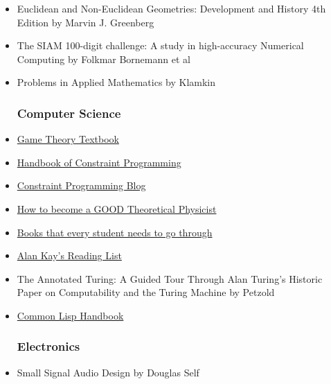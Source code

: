 \begin{itemize}
	\item Euclidean and Non-Euclidean Geometries: Development and History 4th Edition by Marvin J. Greenberg

	\item The SIAM 100-digit challenge: A study in high-accuracy Numerical Computing by Folkmar Bornemann et al

	\item Problems in Applied Mathematics by Klamkin

\subsubsection{Computer Science}

	\item  \href{http://arxiv.org/abs/1512.06808}{Game Theory Textbook}

	\item \href{http://cswww.essex.ac.uk/CSP/papers/CP_Handbook-20060315-final.pdf}{Handbook  of Constraint Programming}
	
	\item \href{http://www.hakank.org/constraint_programming_blog/}{Constraint
  Programming Blog}

	\item \href{http://www.staff.science.uu.nl/~gadda001/goodtheorist/index.html}{How to become a GOOD Theoretical Physicist}
  
	\item \href{http://math.stackexchange.com/questions/94827/books-that-every-student-need\%20s-to-go-through}{Books that every student needs to go through}

	\item \href{http://www.squeakland.org/resources/books/readingList.jsp}{Alan Kay's Reading List}

	\item The Annotated Turing: A Guided Tour Through Alan Turing's Historic
Paper on Computability and the Turing Machine by Petzold

	\item \href{https://lispcookbook.github.io/cl-cookbook/}{Common Lisp Handbook}

\subsubsection{Electronics}

	\item Small Signal Audio Design by Douglas Self


\end{itemize}
